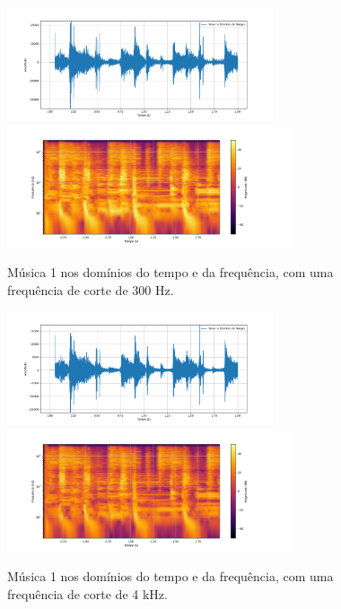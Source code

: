 \begin{figure}[htpb]
    \centering
    \includegraphics[width=0.7\textwidth]{figuras/fig28.png}
    \includegraphics[width=0.75\textwidth]{figuras/fig29.png}
    \caption{Música 1 nos domínios do tempo e da frequência, com uma frequência de corte de 300 Hz.}
    \label{fig28}
\end{figure}

\begin{figure}[htpb]
    \centering
    \includegraphics[width=0.7\textwidth]{figuras/fig26.png}
    \includegraphics[width=0.75\textwidth]{figuras/fig27.png}
    \caption{Música 1 nos domínios do tempo e da frequência, com uma frequência de corte de 4 kHz.}
    \label{fig26}
\end{figure}

